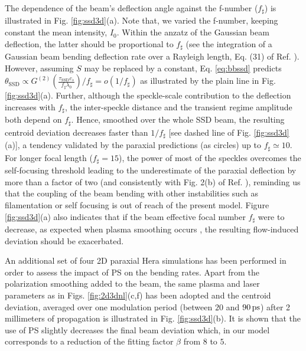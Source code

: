 \documentclass[%
 reprint,
 amsmath,amssymb,
 aps,
]{revtex4-1}
\begin{document}
The dependence of the beam's deflection angle against the f-number ($f_\sharp$) is illustrated in Fig. \ref{fig:ssd3d}(a). Note that, we varied the f-number, keeping constant the mean intensity, $I_0$. Within the anzatz of the  Gaussian beam deflection, the latter should be proportional to $f_\sharp$ (see the integration of a Gaussian beam bending deflection rate  over a Rayleigh length, Eq. (31) of Ref. \cite{POP_Ruyer_2020}). However, assuming $S$ may be replaced by a constant, Eq. \eqref{eq:bbssd} predicts $\theta_\mathrm{SSD}\propto G^{(2)}\left(\frac{\tau_\mathrm{SSD}c_s}{f_\sharp \lambda_0}\right)/f_\sharp=o(1/f_\sharp)$ as illustrated by the plain line in Fig. \ref{fig:ssd3d}(a). Further, although  the speckle-scale contribution to the deflection increases with $f_\sharp$, the inter-speckle distance and  the transient regime amplitude both depend on $f_\sharp$. Hence, smoothed over the whole SSD beam, the resulting centroid deviation decreases faster than $1/f_\sharp$ [see dashed line of Fig. \ref{fig:ssd3d}(a)], a tendency validated by the paraxial predictions (as circles) up to $f_\sharp\simeq 10$. For longer focal length ($f_\sharp=15$), the power of most of the speckles overcomes the self-focusing  threshold \cite[]{POP_Michel_2003} leading to the underestimate of the paraxial deflection by more than a factor of two (and  consistently with Fig. 2(b) of Ref.  \cite{POP_Ruyer_2020}), reminding us that the coupling of the beam bending with other instabilities such as filamentation or self focusing is out of reach of the present model.
 Figure \ref{fig:ssd3d}(a) also indicates that if the beam effective focal number $f_\sharp$ were to decrease, as expected when plasma smoothing occurs \cite[]{POP_Maximov_2001}, the resulting flow-induced deviation should be exacerbated.

An additional set of four 2D paraxial Hera simulations has been performed in order to assess the impact of PS on the bending rates. Apart from the polarization smoothing added to the beam,  the same plasma and laser parameters as in Figs. \ref{fig:2d3dnl}(c,f) has been adopted and the centroid deviation, averaged over one modulation period (between $20$ and $90\,\rm ps$) after 2 millimeters of propagation is illustrated in Fig. \ref{fig:ssd3d}(b). It is shown that the use of PS slightly decreases the final beam deviation which, in our model corresponds to a reduction of the fitting factor $\beta$ from $8$ to $5$.
\end{document}
